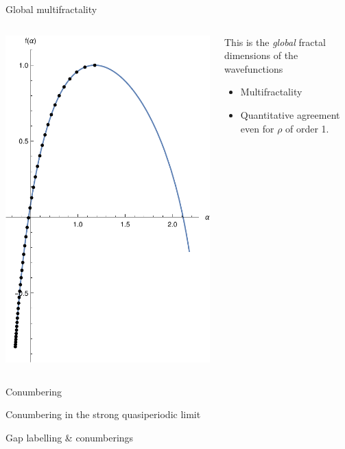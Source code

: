 \documentclass[xcolor=x11names,compress,professionalfonts]{beamer}
\renewcommand{\(}{\begin{columns}}
\renewcommand{\)}{\end{columns}}
\newcommand{\<}[1]{\begin{column}{#1}}
\renewcommand{\>}{\end{column}}
\begin{document}
\begin{frame}{Global multifractality}
\begin{columns}
	\begin{column}{5cm}
		\centering
		\includegraphics[scale=.5]{falpha05.pdf}
	\end{column}
	\begin{column}{5cm}
		This is the \emph{global} fractal dimensions of the wavefunctions
		\begin{itemize}
			\item Multifractality
			\item Quantitative agreement even for $\rho$ of order 1.
		\end{itemize}
	\end{column}
\end{columns}
\end{frame}

\begin{frame}{Conumbering}
\end{frame}

\begin{frame}{Conumbering in the strong quasiperiodic limit}
\end{frame}

\begin{frame}{Gap labelling \& conumberings}
\end{frame}
\end{document}
